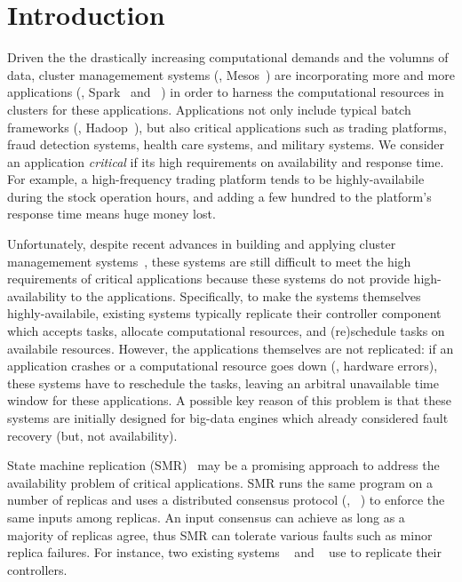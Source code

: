 \section{Introduction} \label{sec:intro}

Driven the the drastically increasing computational demands and the volumns of 
data, cluster managemement systems (\eg, Mesos~\cite{mesos:nsdi11}) are 
incorporating more and more applications (\eg, Spark~\cite{spark:nsdi12} and 
\redis~\cite{redis}) in order to harness the computational resources in 
clusters for these applications. Applications not only include typical batch 
frameworks (\eg, Hadoop~\cite{hadoop}), but also critical applications such as 
trading platforms, fraud detection systems, health care systems, and military 
systems. We consider an application \emph{critical} if its high requirements on 
availability and response time. For example, a high-frequency trading platform 
tends to be highly-availabile during the stock operation hours, and adding a few 
hundred \us to the platform's response time means huge money lost.

Unfortunately, despite recent advances in building and applying cluster 
managemement systems~\cite{borg:eurosys15,mesos:nsdi11,tupperware,yarn:socc13,
autopilot:sosp07,quincy:sosp09,apollo:osdi14,fuxi:vldb14}, these systems are 
still difficult to meet the high requirements of critical applications because 
these systems do not provide high-availability to the applications. 
Specifically, to make the systems themselves highly-availabile, existing systems 
typically replicate their controller component which accepts tasks, allocate 
computational resources, and (re)schedule tasks on availabile resources. 
However, the applications themselves are not replicated: if an application 
crashes or a computational resource goes down (\eg, hardware errors), these 
systems have to reschedule the tasks, leaving an arbitral unavailable time 
window for these applications. A possible key reason of this problem is that 
these systems are initially designed for big-data engines which already 
considered fault recovery (but, not availability).

State machine replication (SMR)~\cite{paxos} may be a promising approach 
to address the availability problem of critical applications. SMR runs the 
same program on a number of replicas and uses a distributed consensus protocol 
(\eg, 
\paxos~\cite{paxos:practical,paxos,paxos:simple,paxos:complex,epaxos:sosp13}) 
to enforce the same inputs among 
replicas. An input consensus can achieve as long as a majority of replicas 
agree, thus SMR can tolerate various faults such as minor replica failures. For 
instance, two existing systems \borg~\cite{borg:eurosys15} and 
\mesos~\cite{mesos:nsdi11} use \paxos to replicate their controllers.

